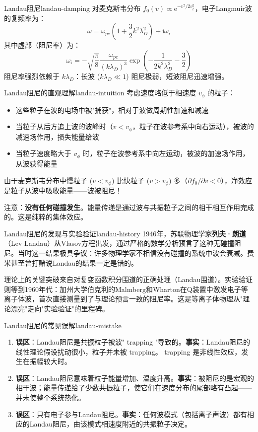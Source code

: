 \documentclass[12pt,a4paper,openany,oneside]{book}
\newcommand{\ii}{\mathrm{i}}
\newcommand{\ee}{\mathrm{e}}
\begin{document}
\begin{theorem}{Landau阻尼}{landau-damping}
对麦克斯韦分布 $f_0(v) \propto \ee^{-v^2/2v_t^2}$，电子Langmuir波的复频率为：
\[
\omega = \omega_{pe}\left(1 + \frac{3}{2}k^2\lambda_D^2\right) + \ii\omega_i
\]
其中虚部（阻尼率）为：
\[
\omega_i = -\sqrt{\frac{\pi}{8}}\frac{\omega_{pe}}{(k\lambda_D)^3}\exp\left(-\frac{1}{2k^2\lambda_D^2} - \frac{3}{2}\right)
\]
阻尼率强烈依赖于 $k\lambda_D$：长波 ($k\lambda_D \ll 1$) 阻尼极弱，短波阻尼迅速增强。
\end{theorem}

\begin{insight}{Landau阻尼的直观理解}{landau-intuition}
考虑速度略低于相速度 $v_\phi$ 的粒子：
\begin{itemize}
\item 这些粒子在波的电场中被"捕获"，相对于波做周期性加速和减速
\item 当粒子从后方追上波的波峰时（$v < v_\phi$，粒子在波参考系中向右运动），被波的减速场作用，损失能量给波
\item 当粒子速度略大于 $v_\phi$ 时，粒子在波参考系中向左运动，被波的加速场作用，从波获得能量
\end{itemize}

由于麦克斯韦分布中慢粒子 ($v < v_\phi$) 比快粒子 ($v > v_\phi$) 多（$\partial f_0/\partial v < 0$），净效应是粒子从波中吸收能量——波被阻尼！

注意：\textbf{没有任何碰撞发生}。能量传递是通过波与共振粒子之间的相干相互作用完成的。这是纯粹的集体效应。
\end{insight}

\begin{history}{Landau阻尼的发现与实验验证}{landau-history}
1946年，苏联物理学家\textbf{列夫·朗道}（Lev Landau）从Vlasov方程出发，通过严格的数学分析预言了这种无碰撞阻尼。当时这一结果极具争议：许多物理学家不相信没有碰撞的系统中波会衰减。费米甚至曾打赌说Landau的结果一定是错的。

理论上的关键突破来自对复变函数积分围道的正确处理（Landau围道）。实验验证则等到1960年代：加州大学伯克利的Malmberg和Wharton在Q装置中激发电子等离子体波，首次直接测量到了与理论预言一致的阻尼率。这是等离子体物理从"理论漂亮"走向"实验验证"的里程碑。
\end{history}

\begin{warning}{Landau阻尼的常见误解}{landau-mistake}
\begin{enumerate}
\item \textbf{误区}：Landau阻尼是共振粒子被波" trapping "导致的。\textbf{事实}：Landau阻尼的线性理论假设扰动很小，粒子并未被 trapping。 trapping 是非线性效应，发生在振幅较大时。
\item \textbf{误区}：Landau阻尼意味着粒子能量增加、温度升高。\textbf{事实}：被阻尼的是宏观的相干波；能量传递给了少数共振粒子，使它们在速度分布的尾部略有凸起——并未使整个系统热化。
\item \textbf{误区}：只有电子参与Landau阻尼。\textbf{事实}：任何波模式（包括离子声波）都有相应的Landau阻尼，由该模式相速度附近的共振粒子决定。
\end{enumerate}
\end{warning}
\end{document}
